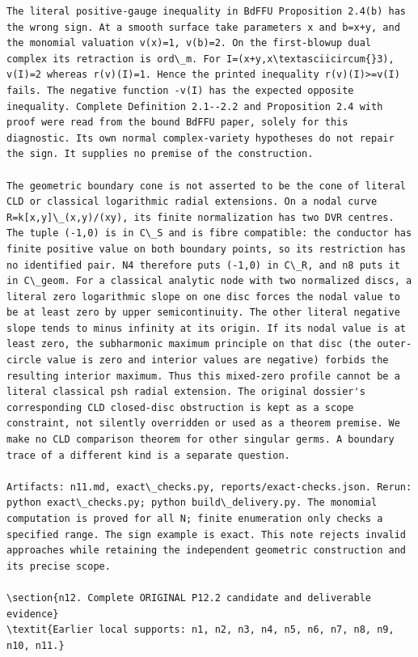 \documentclass[11pt]{article}
\begin{document}
\begin{Verbatim}[fontsize=\tiny,breaklines=true,breakanywhere=true]
The literal positive-gauge inequality in BdFFU Proposition 2.4(b) has the wrong sign. At a smooth surface take parameters x and b=x+y, and the monomial valuation v(x)=1, v(b)=2. On the first-blowup dual complex its retraction is ord\_m. For I=(x+y,x\textasciicircum{}3), v(I)=2 whereas r(v)(I)=1. Hence the printed inequality r(v)(I)>=v(I) fails. The negative function -v(I) has the expected opposite inequality. Complete Definition 2.1--2.2 and Proposition 2.4 with proof were read from the bound BdFFU paper, solely for this diagnostic. Its own normal complex-variety hypotheses do not repair the sign. It supplies no premise of the construction.

The geometric boundary cone is not asserted to be the cone of literal CLD or classical logarithmic radial extensions. On a nodal curve R=k[x,y]\_(x,y)/(xy), its finite normalization has two DVR centres. The tuple (-1,0) is in C\_S and is fibre compatible: the conductor has finite positive value on both boundary points, so its restriction has no identified pair. N4 therefore puts (-1,0) in C\_R, and n8 puts it in C\_geom. For a classical analytic node with two normalized discs, a literal zero logarithmic slope on one disc forces the nodal value to be at least zero by upper semicontinuity. The other literal negative slope tends to minus infinity at its origin. If its nodal value is at least zero, the subharmonic maximum principle on that disc (the outer-circle value is zero and interior values are negative) forbids the resulting interior maximum. Thus this mixed-zero profile cannot be a literal classical psh radial extension. The original dossier's corresponding CLD closed-disc obstruction is kept as a scope constraint, not silently overridden or used as a theorem premise. We make no CLD comparison theorem for other singular germs. A boundary trace of a different kind is a separate question.

Artifacts: n11.md, exact\_checks.py, reports/exact-checks.json. Rerun: python exact\_checks.py; python build\_delivery.py. The monomial computation is proved for all N; finite enumeration only checks a specified range. The sign example is exact. This note rejects invalid approaches while retaining the independent geometric construction and its precise scope.

\section{n12. Complete ORIGINAL P12.2 candidate and deliverable evidence}
\textit{Earlier local supports: n1, n2, n3, n4, n5, n6, n7, n8, n9, n10, n11.}


\end{Verbatim}
\end{document}

